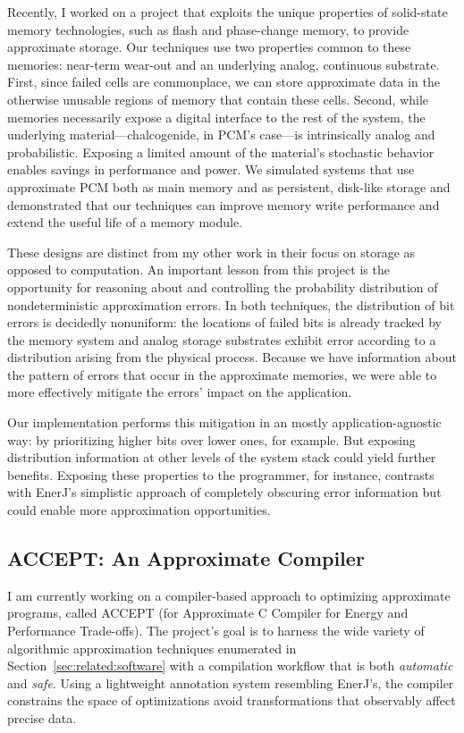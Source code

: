 Recently, I worked on a project that exploits the unique properties of
solid-state memory technologies, such as flash and phase-change memory,
to provide approximate storage. Our techniques use two properties common to these memories:
near-term wear-out and an underlying analog, continuous substrate. First, since
failed cells are commonplace, we can store approximate data in the otherwise
unusable regions of memory that contain these cells. Second, while memories
necessarily expose a digital interface to the rest of the system, the
underlying material---chalcogenide, in PCM's case---is intrinsically analog
and probabilistic. Exposing a limited amount of the material's stochastic
behavior enables savings in performance and power.
We simulated systems that use approximate PCM both as main memory and as
persistent, disk-like storage and demonstrated that our techniques can improve
memory write performance and extend the useful life of a memory module.

These designs are distinct from my other work in their focus on storage as
opposed to computation. An important lesson from this project is the
opportunity for reasoning about and controlling the probability distribution
of nondeterministic approximation errors. In both techniques, the distribution
of bit errors is decidedly nonuniform: the locations of failed bits is already
tracked by the memory system and analog storage substrates exhibit error
according to a distribution arising from the physical process. Because we have
information about the pattern of errors that occur in the approximate
memories, we were able to more effectively mitigate the errors' impact on the
application.

Our implementation performs this mitigation in an mostly application-agnostic
way: by prioritizing higher bits over lower ones, for example. But exposing
distribution information at other levels of the system stack could yield
further benefits. Exposing these properties to the programmer, for instance,
contrasts with EnerJ's simplistic approach of completely obscuring error
information but could enable more approximation opportunities.

\subsection{ACCEPT: An Approximate Compiler}
\label{sec:prelim:accept}

I am currently working on a compiler-based approach to optimizing approximate
programs, called ACCEPT (for Approximate C Compiler for Energy and Performance
Trade-offs). The project's goal is to harness the wide variety of
algorithmic approximation techniques enumerated in
Section~\ref{sec:related:software} with a compilation workflow that is both
\emph{automatic} and \emph{safe}. Using a lightweight annotation system
resembling EnerJ's, the compiler constrains the space of optimizations avoid
transformations that observably affect precise data.

